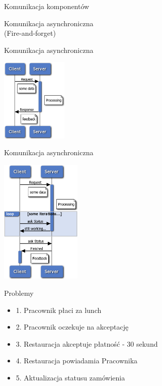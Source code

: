 \documentclass{beamer}
\begin{document}
\begin{frame}{Komunikacja komponentów}
	\begin{center}
		\Huge{Komunikacja asynchroniczna}\\
		\huge{(Fire-and-forget)}
	\end{center}
\end{frame}

\begin{frame}{Komunikacja asynchroniczna}
	\begin{center}
		\includegraphics[height=4cm]{async1.png}
	\end{center}
\end{frame}

\begin{frame}{Komunikacja asynchroniczna}
	\begin{center}
		\includegraphics[height=6cm]{async2.png}
	\end{center}
\end{frame}

\begin{frame}{Problemy}
	\begin{Large}
		\begin{itemize}[<+->]
			\item 1. Pracownik płaci za lunch
			\item 2. Pracownik oczekuje na akceptację
			\item 3. Restauracja akceptuje płatność - 30 sekund
			\item 4. Restauracja powiadamia Pracownika
			\item 5. Aktualizacja statusu zamówienia
		\end{itemize}
	\end{Large}
\end{frame}
\end{document}
